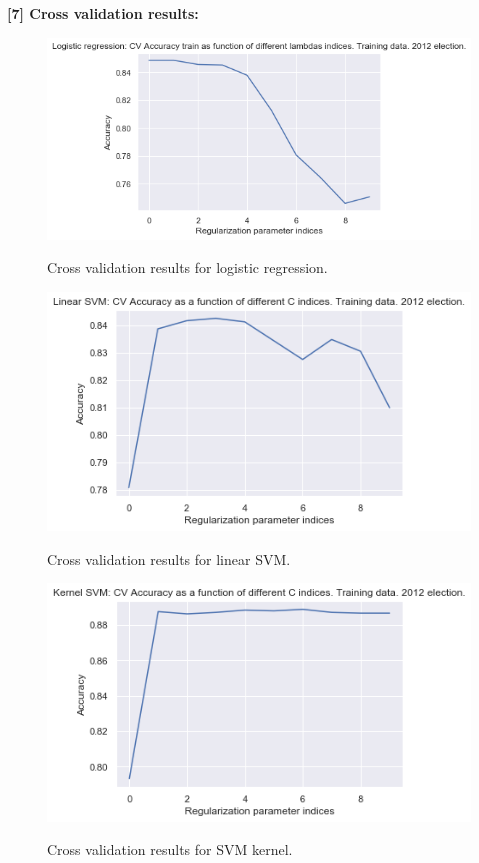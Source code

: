 \newpage
\textbf{[7] Cross validation results:}\\

\begin{figure}[H]
\centering
{\includegraphics[scale=0.33]{pictures/results/LogReg_Accuracy_train_CV.png}\label{fig:f3}}
\caption{Cross validation results for logistic regression.}
\end{figure}

\begin{figure}[H]
\centering
{\includegraphics[scale=0.33]{pictures/results/SVML_Accuracy_train_CV.png}\label{fig:f3}}
\caption{Cross validation results for linear SVM.}
\end{figure}

\begin{figure}[H]
\centering
{\includegraphics[scale=0.33]{pictures/results/SVMK_Accuracy_train_CV.png}\label{fig:f3}}
\caption{Cross validation results for SVM kernel.}
\end{figure}

